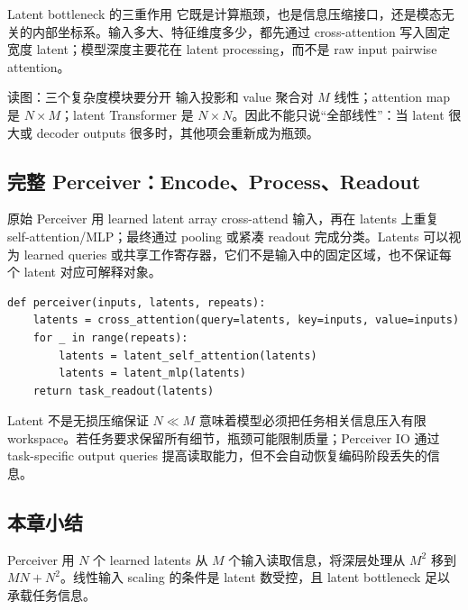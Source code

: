 
\begin{importantbox}{Latent bottleneck 的三重作用}
它既是计算瓶颈，也是信息压缩接口，还是模态无关的内部坐标系。输入多大、特征维度多少，都先通过 cross-attention 写入固定宽度 latent；模型深度主要花在 latent processing，而不是 raw input pairwise attention。
\end{importantbox}

\begin{knowledgebox}{读图：三个复杂度模块要分开}
输入投影和 value 聚合对 $M$ 线性；attention map 是 $N\times M$；latent Transformer 是 $N\times N$。因此不能只说“全部线性”：当 latent 很大或 decoder outputs 很多时，其他项会重新成为瓶颈。
\end{knowledgebox}

\subsection{完整 Perceiver：Encode、Process、Readout}

原始 Perceiver 用 learned latent array cross-attend 输入，再在 latents 上重复 self-attention/MLP；最终通过 pooling 或紧凑 readout 完成分类。Latents 可以视为 learned queries 或共享工作寄存器，它们不是输入中的固定区域，也不保证每个 latent 对应可解释对象。


\begin{lstlisting}[caption={Perceiver encode/process/readout 的概念性伪代码。}]
def perceiver(inputs, latents, repeats):
    latents = cross_attention(query=latents, key=inputs, value=inputs)
    for _ in range(repeats):
        latents = latent_self_attention(latents)
        latents = latent_mlp(latents)
    return task_readout(latents)
\end{lstlisting}


\begin{warningbox}{Latent 不是无损压缩保证}
$N\ll M$ 意味着模型必须把任务相关信息压入有限 workspace。若任务要求保留所有细节，瓶颈可能限制质量；Perceiver IO 通过 task-specific output queries 提高读取能力，但不会自动恢复编码阶段丢失的信息。
\end{warningbox}

\subsection{本章小结}

Perceiver 用 $N$ 个 learned latents 从 $M$ 个输入读取信息，将深层处理从 $M^2$ 移到 $MN+N^2$。线性输入 scaling 的条件是 latent 数受控，且 latent bottleneck 足以承载任务信息。

